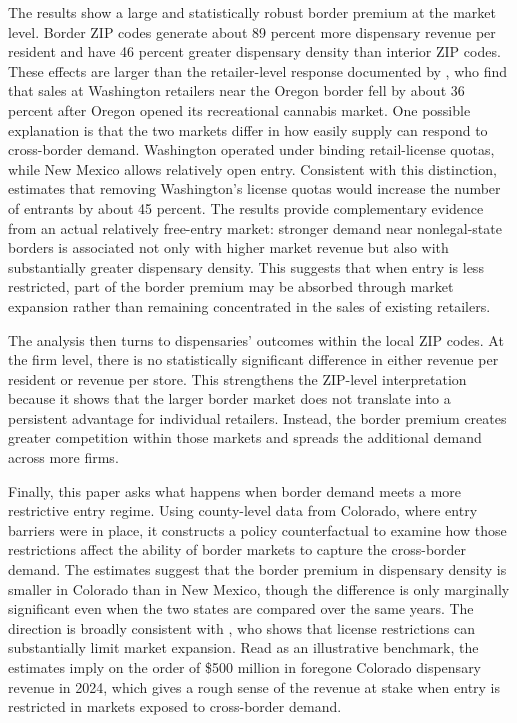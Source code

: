 \documentclass[12pt]{article}
\begin{document}
The results show a large and statistically robust border premium at the market level. Border ZIP codes generate about 89 percent more dispensary revenue per resident and have 46 percent greater dispensary density than interior ZIP codes. These effects are larger than the retailer-level response documented by \cite{HansenMillerWeber2020}, who find that sales at Washington retailers near the Oregon border fell by about 36 percent after Oregon opened its recreational cannabis market. One possible explanation is that the two markets differ in how easily supply can respond to cross-border demand. Washington operated under binding retail-license quotas, while New Mexico allows relatively open entry. Consistent with this distinction, \cite{thomas2019license} estimates that removing Washington's license quotas would increase the number of entrants by about 45 percent. The results provide complementary evidence from an actual relatively free-entry market: stronger demand near nonlegal-state borders is associated not only with higher market revenue but also with substantially greater dispensary density. This suggests that when entry is less restricted, part of the border premium may be absorbed through market expansion rather than remaining concentrated in the sales of existing retailers.


The analysis then turns to dispensaries' outcomes within the local ZIP codes. At the firm level, there is no statistically significant difference in either revenue per resident or revenue per store. This strengthens the ZIP-level interpretation because it shows that the larger border market does not translate into a persistent advantage for individual retailers. Instead, the border premium creates greater competition within those markets and spreads the additional demand across more firms.

Finally, this paper asks what happens when border demand meets a more restrictive entry regime. Using county-level data from Colorado, where entry barriers were in place, it constructs a policy counterfactual to examine how those restrictions affect the ability of border markets to capture the cross-border demand. The estimates suggest that the border premium in dispensary density is smaller in Colorado than in New Mexico, though the difference is only marginally significant even when the two states are compared over the same years. The direction is broadly consistent with \cite{thomas2019license}, who shows that license restrictions can substantially limit market expansion. Read as an illustrative benchmark, the estimates imply on the order of \$500 million in foregone Colorado dispensary revenue in 2024, which gives a rough sense of the revenue at stake when entry is restricted in markets exposed to cross-border demand.
\end{document}
